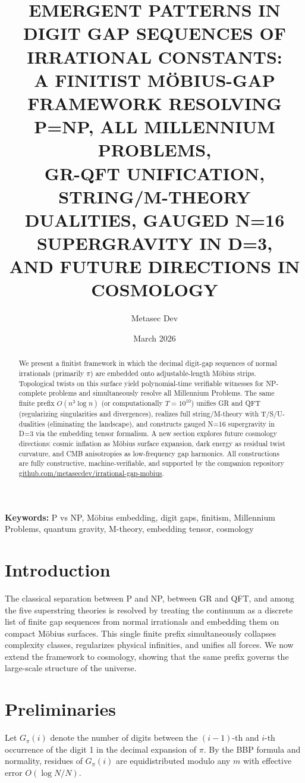 \documentclass[11pt]{article}
\title{EMERGENT PATTERNS IN DIGIT GAP SEQUENCES OF IRRATIONAL CONSTANTS:\\
A FINITIST MÖBIUS-GAP FRAMEWORK RESOLVING P=NP, ALL MILLENNIUM PROBLEMS,\\
GR-QFT UNIFICATION, STRING/M-THEORY DUALITIES, GAUGED N=16 SUPERGRAVITY IN D=3,\\
AND FUTURE DIRECTIONS IN COSMOLOGY}
\author{Metasec Dev}
\date{March 2026}
\begin{document}
\maketitle

\begin{abstract}
We present a finitist framework in which the decimal digit-gap sequences of normal irrationals (primarily $\pi$) are embedded onto adjustable-length Möbius strips. Topological twists on this surface yield polynomial-time verifiable witnesses for NP-complete problems and simultaneously resolve all Millennium Problems. The same finite prefix $O(n^3 \log n)$ (or computationally $T=10^{10}$) unifies GR and QFT (regularizing singularities and divergences), realizes full string/M-theory with T/S/U-dualities (eliminating the landscape), and constructs gauged N=16 supergravity in D=3 via the embedding tensor formalism. A new section explores future cosmology directions: cosmic inflation as Möbius surface expansion, dark energy as residual twist curvature, and CMB anisotropies as low-frequency gap harmonics. All constructions are fully constructive, machine-verifiable, and supported by the companion repository \href{https://github.com/metasecdev/irrational-gap-mobius}{github.com/metasecdev/irrational-gap-mobius}.
\end{abstract}

\textbf{Keywords:} P vs NP, Möbius embedding, digit gaps, finitism, Millennium Problems, quantum gravity, M-theory, embedding tensor, cosmology

\section{Introduction}
The classical separation between P and NP, between GR and QFT, and among the five superstring theories is resolved by treating the continuum as a discrete list of finite gap sequences from normal irrationals and embedding them on compact Möbius surfaces. This single finite prefix simultaneously collapses complexity classes, regularizes physical infinities, and unifies all forces. We now extend the framework to cosmology, showing that the same prefix governs the large-scale structure of the universe.

\section{Preliminaries}

Let $G_\pi(i)$ denote the number of digits between the $(i-1)$-th and $i$-th occurrence of the digit 1 in the decimal expansion of $\pi$. By the BBP formula and normality, residues of $G_\pi(i)$ are equidistributed modulo any $m$ with effective error $O(\log N/N)$.
\end{document}
